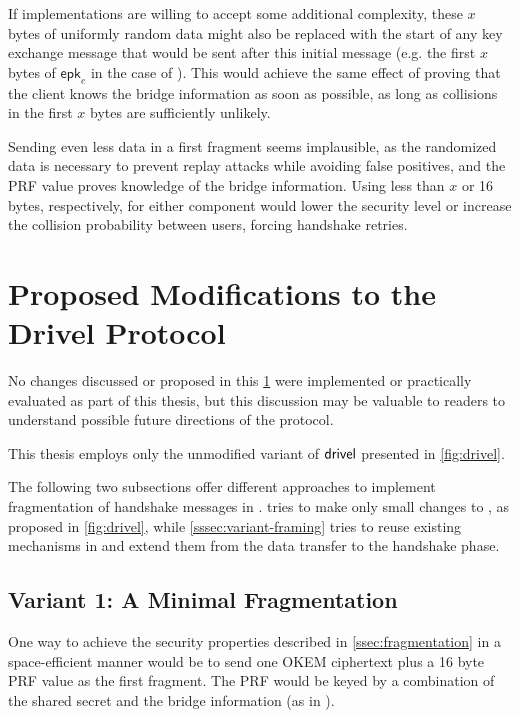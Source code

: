 If implementations are willing to accept some additional complexity, these $x$ bytes of uniformly random data might also be replaced with the start of any key exchange message that would be sent after this initial message (e.g. the first $x$ bytes of $\mathsf{epk}_e$ in the case of \drivel{}). This would achieve the same effect of proving that the client knows the bridge information as soon as possible, as long as collisions in the first $x$ bytes are sufficiently unlikely.

Sending even less data in a first fragment seems implausible, as the randomized data is necessary to prevent replay attacks while avoiding false positives, and the PRF value proves knowledge of the bridge information. Using less than $x$ or 16 bytes, respectively, for either component would lower the security level or increase the collision probability between users, forcing handshake retries.

\section{Proposed Modifications to the Drivel Protocol} \label{ssec:drivel-mod}

No changes discussed or proposed in this \cref{ssec:drivel-mod} were implemented or practically evaluated as part of this thesis, but this discussion may be valuable to readers to understand possible future directions of the protocol.

This thesis employs only the unmodified variant of $\textsf{drivel}{}$ presented in \cref{fig:drivel}.

The following two subsections offer different approaches to implement fragmentation of handshake messages in \drivel{}.  tries to make only small changes to \drivel{}, as proposed in \cref{fig:drivel}, while \cref{sssec:variant-framing} tries to reuse existing mechanisms in \obfsfour{} and extend them from the data transfer to the handshake phase.

\subsection{Variant 1: A Minimal Fragmentation} \label{sssec:variant-minimal}

One way to achieve the security properties described in \cref{ssec:fragmentation} in a space-efficient manner would be to send one OKEM ciphertext plus a 16 byte PRF value as the first fragment. The PRF would be keyed by a combination of the shared secret and the bridge information (as in \drivel{}).

